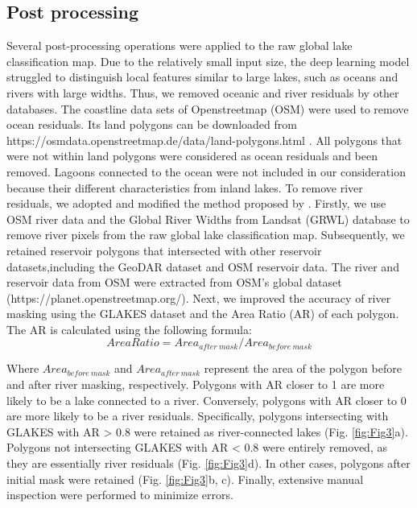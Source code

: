 \documentclass[preprint,12pt,authoryear]{elsarticle}
\begin{document}
\subsection{Post processing}
\label{subsec4}

Several post-processing operations were applied to the raw global lake classification map. Due to the relatively small input size, the deep learning model struggled to distinguish local features similar to large lakes, such as oceans and rivers with large widths. Thus, we removed oceanic and river residuals by other databases. The coastline data sets of Openstreetmap (OSM) \citep{goodchild_citizens_2007} were used to remove ocean residuals. Its land polygons can be downloaded from https://osmdata.openstreetmap.de/data/land-polygons.html . All polygons that were not within land polygons were considered as ocean residuals and been removed. Lagoons connected to the ocean were not included in our consideration because their different characteristics from inland lakes. To remove river residuals, we adopted and modified the method proposed by \citet{pi_mapping_2022}. Firstly, we use OSM river data and the Global River Widths from Landsat (GRWL)\citep{allen_global_2018} database to remove river pixels from the raw global lake classification map. Subsequently, we retained reservoir polygons that intersected with other reservoir datasets,including the GeoDAR dataset \citep{wang_surface_2025} and OSM reservoir data. The river and reservoir data from OSM were extracted from OSM's global dataset (https://planet.openstreetmap.org/). Next, we improved the accuracy of river masking using the GLAKES dataset and the Area Ratio (AR) of each polygon. The AR is calculated using the following formula:
\begin{equation}
Area Ratio = Area_{after\ mask}/Area_{before\ mask}
\end{equation}

Where $Area_{before\ mask}$ and $Area_{after\ mask}$ represent the area of the polygon before and after river masking, respectively. Polygons with AR closer to 1 are more likely to be a lake connected to a river. Conversely, polygons with AR closer to 0 are more likely to be a river residuals. Specifically, polygons intersecting with GLAKES with AR > 0.8 were retained as river-connected lakes (Fig. \ref{fig:Fig3}a). Polygons not intersecting GLAKES with AR < 0.8 were entirely removed, as they are essentially river residuals (Fig. \ref{fig:Fig3}d). In other cases, polygons after initial mask were retained (Fig. \ref{fig:Fig3}b, c). Finally, extensive manual inspection were performed to minimize errors.
\end{document}
